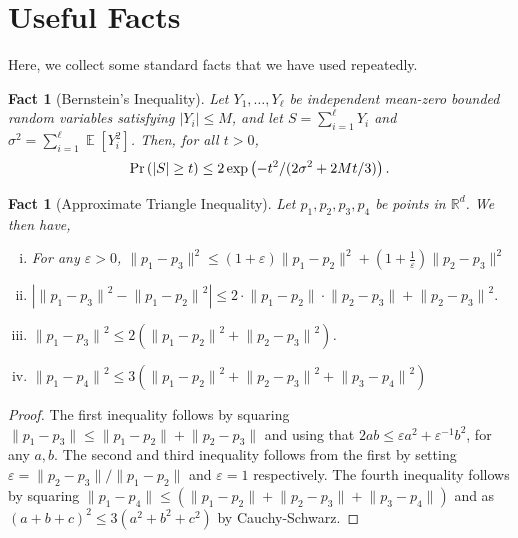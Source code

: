 \documentclass[11pt]{article}
\newtheorem{fact}[lemma]{Fact}
\theoremstyle{restate}
\theoremstyle{definition}
\newcommand{\eps}{\ensuremath{\varepsilon}}
\newcommand{\R}{\ensuremath{\mathbb{R}}}
\newcommand{\norm}[1]{\ensuremath{\|#1\|}}
\DeclareMathOperator*{\Prob}{\ensuremath{\textnormal{Pr}}}
\renewcommand{\Pr}{\Prob}
\newcommand{\E}{\mathop{\mathbb{E}}}
\begin{document}
\section{Useful Facts}\label{app: missing-proofs}
Here, we collect some standard facts that we have used repeatedly.
\begin{fact}[Bernstein's Inequality]\label{lem: bernstein}
	Let $Y_1, \ldots, Y_\ell$ be independent mean-zero bounded random variables satisfying $|Y_i| \leq M$, and let $S=\sum_{i=1}^\ell Y_i$ and $\sigma^2 =\sum_{i = 1}^\ell \E[Y_i^2]$. Then, for all $t>0$,
 \begin{align*}
		\Pr\left( |S| \geq t \right) \leq 2\exp\left(-t^2/(2\sigma^2 + 2Mt/3)\right).
	\end{align*}
	
\end{fact}
\begin{fact}[Approximate Triangle Inequality]\label{fact: triangle}
   Let $p_1, p_2, p_3, p_4$ be points in $\R^d$. We then have,
    \begin{enumerate}[(i)]
    \item\label{item:weaktri} \label{item: tri-1} For any $\eps > 0$, $\|p_1-p_3\|^2 \leq (1+\varepsilon)\|p_1-p_2\|^2 + \left(1+\frac{1}{\varepsilon}\right) \|p_2-p_3\|^2$
        \item \label{item: tri-2}$\left|\norm{p_1 - p_3}^2 - \norm{p_1- p_2}^2 \right| \leq 2 \cdot\norm{p_1 - p_2} \cdot \norm{p_2-p_3} + \norm{p_2- p_3}^2.$
         \item \label{item: tri-3} $\norm{p_1 - p_3}^2 \leq 2 (\norm{p_1 - p_2}^2 + \norm{p_2 - p_3}^2)$.    
         \item \label{item: tri-4} $\norm{p_1 - p_4}^2 \leq 3(\norm{p_1 - p_2}^2 + \norm{p_2 - p_3}^2 + \norm{p_3 - p_4}^2)$
    \end{enumerate}

\end{fact}
\begin{proof}
    The first inequality follows by squaring  $\norm{p_1-p_3} \leq \norm {p_1-p_2} + \norm{p_2-p_3}$ and using that $2ab \leq \eps a^2 + \eps^{-1} b^2$, for any $a,b$. 
    The second and third inequality follows from the first by setting $\eps = \norm{p_2 - p_3}/\norm{p_1 - p_2}$ and  $\eps = 1$ respectively. The fourth inequality follows by squaring
  $\norm{p_1 - p_4} \leq (\norm{p_1 - p_2} + \norm{p_2 - p_3} + \norm{p_3 - p_4})$ and as  $(a+b+c)^2 \leq 3(a^2 + b^2 + c^2)$ by  Cauchy-Schwarz. \qedhere
\end{proof}
\end{document}
